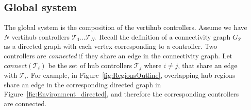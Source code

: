 




\subsection{Global system}
The global system is the composition of the vertihub controllers. Assume we have $N$ vertihub controllers $\mathcal{T}_1 \dots \mathcal{T}_N$. Recall the definition of a connectivity graph $G_{\mathcal{T}}$ as a directed graph with each vertex corresponding to a controller. Two controllers are \emph{connected} if they share an edge in the connectivity graph. Let $connect(\mathcal T_i)$ be the set of hub controllers $\mathcal{T}_j$ where $i \neq j$, that share an edge with $\mathcal{T}_i$. For example, in Figure~\ref{fig:RegionsOutline}, overlapping hub regions share an edge in the corresponding directed graph in Figure~\ref{fig:Environment_directed}, and therefore the corresponding controllers are connected. 

